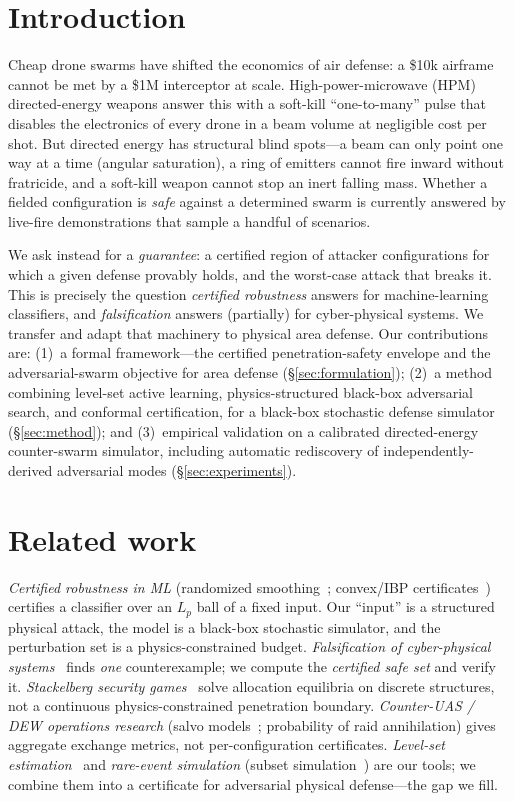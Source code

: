 \documentclass[11pt]{article}
\begin{document}
\section{Introduction}
Cheap drone swarms have shifted the economics of air defense: a \$10k airframe cannot be met
by a \$1M interceptor at scale. High-power-microwave (HPM) directed-energy weapons answer this
with a soft-kill ``one-to-many'' pulse that disables the electronics of every drone in a beam
volume at negligible cost per shot. But directed energy has structural blind spots---a beam
can only point one way at a time (angular saturation), a ring of emitters cannot fire inward
without fratricide, and a soft-kill weapon cannot stop an inert falling mass. Whether a fielded
configuration is \emph{safe} against a determined swarm is currently answered by live-fire
demonstrations that sample a handful of scenarios.

We ask instead for a \emph{guarantee}: a certified region of attacker configurations for which
a given defense provably holds, and the worst-case attack that breaks it. This is precisely the
question \emph{certified robustness} answers for machine-learning classifiers, and
\emph{falsification} answers (partially) for cyber-physical systems. We transfer and adapt that
machinery to physical area defense. Our contributions are: (1)~a formal framework---the
certified penetration-safety envelope and the adversarial-swarm objective for area defense
(\S\ref{sec:formulation}); (2)~a method combining level-set active learning, physics-structured
black-box adversarial search, and conformal certification, for a black-box stochastic defense
simulator (\S\ref{sec:method}); and (3)~empirical validation on a calibrated directed-energy
counter-swarm simulator, including automatic rediscovery of independently-derived adversarial
modes (\S\ref{sec:experiments}).

\section{Related work}
\emph{Certified robustness in ML} (randomized smoothing~\cite{cohen2019}; convex/IBP
certificates~\cite{wong2018}) certifies a classifier over an $L_p$ ball of a fixed input. Our
``input'' is a structured physical attack, the model is a black-box stochastic simulator, and
the perturbation set is a physics-constrained budget. \emph{Falsification of cyber-physical
systems}~\cite{fainekos2009,donze2010} finds \emph{one} counterexample; we compute the
\emph{certified safe set} and verify it. \emph{Stackelberg security games}~\cite{tambe2011}
solve allocation equilibria on discrete structures, not a continuous physics-constrained
penetration boundary. \emph{Counter-UAS / DEW operations research} (salvo models~\cite{hughes1995};
probability of raid annihilation) gives aggregate exchange metrics, not per-configuration
certificates. \emph{Level-set estimation}~\cite{gotovos2013} and \emph{rare-event simulation}
(subset simulation~\cite{aubeck2001}) are our tools; we combine them into a certificate for
adversarial physical defense---the gap we fill.
\end{document}
